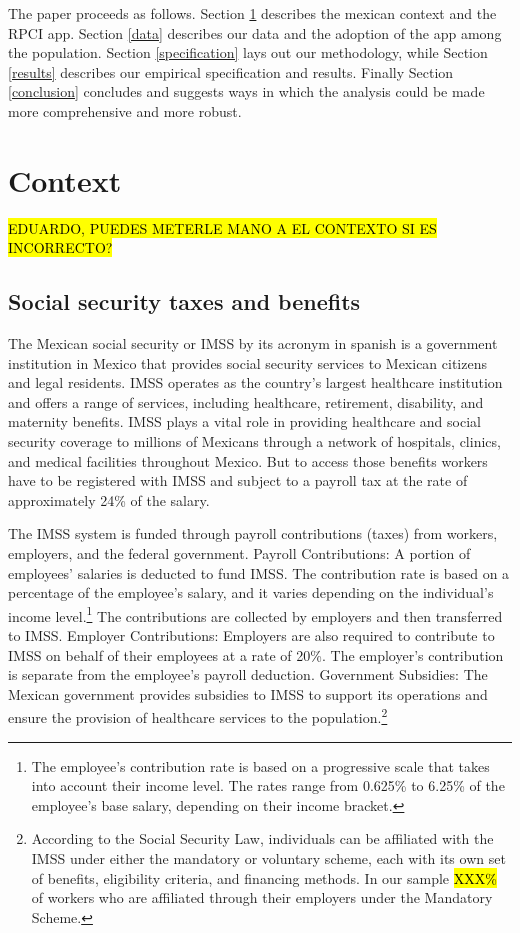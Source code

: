 \documentclass[oneside,11pt]{article}
\begin{document}
The paper proceeds as follows. Section \ref{context} describes the mexican context and the RPCI app. Section \ref{data} describes our data and the adoption of the app among the population. Section \ref{specification} lays out our methodology, while Section \ref{results} describes our empirical specification and results. Finally Section \ref{conclusion} concludes and suggests ways in which the analysis could be made more comprehensive and more robust.


\section{Context} \label{context}

\vspace{.2in}
\hl{EDUARDO, PUEDES METERLE MANO A EL CONTEXTO SI ES INCORRECTO?}

\subsection{Social security taxes and benefits}

The Mexican social security  or IMSS by its acronym in spanish is a government institution in Mexico that provides social security services to Mexican citizens and legal residents. IMSS operates as the country's largest healthcare institution and offers a range of services, including healthcare, retirement, disability, and maternity benefits. IMSS plays a vital role in providing healthcare and social security coverage to millions of Mexicans through a network of hospitals, clinics, and medical facilities throughout Mexico. But to access those benefits workers have to be registered with IMSS and subject to a payroll tax at the rate of approximately 24\% of the salary. 

The IMSS system is funded through payroll contributions (taxes) from workers, employers, and the federal government. Payroll Contributions: A portion of employees' salaries is deducted to fund IMSS. The contribution rate is based on a percentage of the employee's salary, and it varies depending on the individual's income level.\footnote{The employee's contribution rate is based on a progressive scale that takes into account their income level. The rates range from 0.625\% to 6.25\% of the employee's base salary, depending on their income bracket.} The contributions are collected by employers and then transferred to IMSS. Employer Contributions: Employers are also required to contribute to IMSS on behalf of their employees at a rate of 20\%. The employer's contribution is separate from the employee's payroll deduction. Government Subsidies: The Mexican government provides subsidies to IMSS to support its operations and ensure the provision of healthcare services to the population.\footnote{According to the Social Security Law, individuals can be affiliated with the IMSS under either the mandatory or voluntary scheme, each with its own set of benefits, eligibility criteria, and financing methods. In our sample \hl{XXX\%} of workers who are affiliated through their employers under the Mandatory Scheme.}
\end{document}
